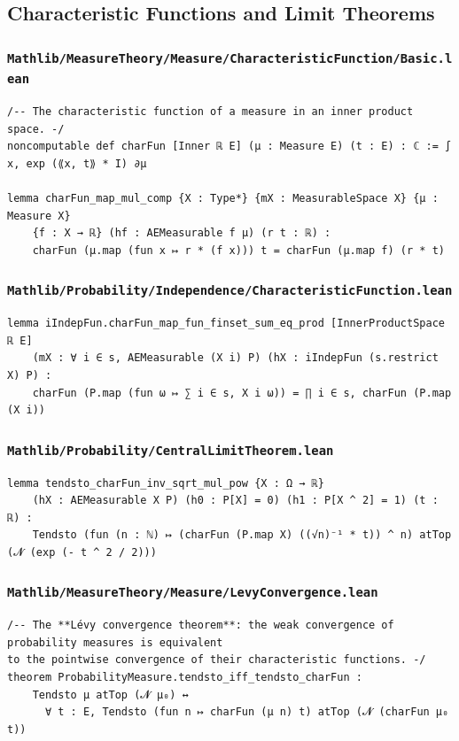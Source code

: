 \subsection{Characteristic Functions and Limit Theorems}

\subsubsection{\texttt{Mathlib/MeasureTheory/Measure/CharacteristicFunction/Basic.lean}}
\begin{lstlisting}[language=lean]
/-- The characteristic function of a measure in an inner product space. -/
noncomputable def charFun [Inner ℝ E] (μ : Measure E) (t : E) : ℂ := ∫ x, exp (⟪x, t⟫ * I) ∂μ

lemma charFun_map_mul_comp {X : Type*} {mX : MeasurableSpace X} {μ : Measure X}
    {f : X → ℝ} (hf : AEMeasurable f μ) (r t : ℝ) :
    charFun (μ.map (fun x ↦ r * (f x))) t = charFun (μ.map f) (r * t)
\end{lstlisting}

\subsubsection{\texttt{Mathlib/Probability/Independence/CharacteristicFunction.lean}}
\begin{lstlisting}[language=lean]
lemma iIndepFun.charFun_map_fun_finset_sum_eq_prod [InnerProductSpace ℝ E]
    (mX : ∀ i ∈ s, AEMeasurable (X i) P) (hX : iIndepFun (s.restrict X) P) :
    charFun (P.map (fun ω ↦ ∑ i ∈ s, X i ω)) = ∏ i ∈ s, charFun (P.map (X i))
\end{lstlisting}

\subsubsection{\texttt{Mathlib/Probability/CentralLimitTheorem.lean}}
\begin{lstlisting}[language=lean]
lemma tendsto_charFun_inv_sqrt_mul_pow {X : Ω → ℝ}
    (hX : AEMeasurable X P) (h0 : P[X] = 0) (h1 : P[X ^ 2] = 1) (t : ℝ) :
    Tendsto (fun (n : ℕ) ↦ (charFun (P.map X) ((√n)⁻¹ * t)) ^ n) atTop (𝓝 (exp (- t ^ 2 / 2)))
\end{lstlisting}

\subsubsection{\texttt{Mathlib/MeasureTheory/Measure/LevyConvergence.lean}}
\begin{lstlisting}[language=lean]
/-- The **Lévy convergence theorem**: the weak convergence of probability measures is equivalent
to the pointwise convergence of their characteristic functions. -/
theorem ProbabilityMeasure.tendsto_iff_tendsto_charFun :
    Tendsto μ atTop (𝓝 μ₀) ↔
      ∀ t : E, Tendsto (fun n ↦ charFun (μ n) t) atTop (𝓝 (charFun μ₀ t))
\end{lstlisting}


